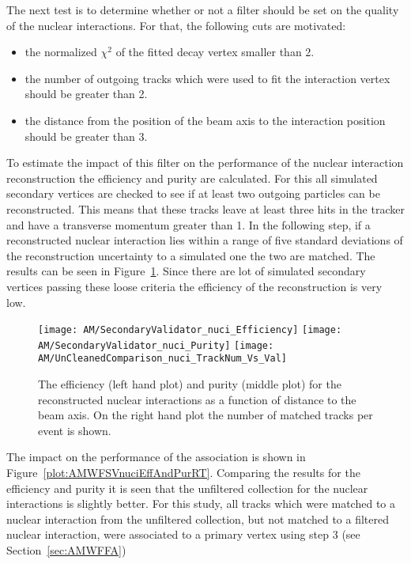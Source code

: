 The next test is to determine whether or not a filter should be set on the quality of the nuclear interactions. For that, the following cuts are motivated:
\begin{itemize}
\item the normalized $\chi^{2}$ of the fitted decay vertex smaller than 2.
\item the number of outgoing tracks which were used to fit the interaction vertex should be greater than 2.
\item the distance from the position of the beam axis to the interaction position should be greater than 3\cm.
\end{itemize}
To estimate the impact of this filter on the performance of the nuclear interaction reconstruction the efficiency and purity are calculated. For this all simulated secondary vertices are checked to see if at least two outgoing particles can be reconstructed. This means that these tracks leave at least three hits in the tracker and have a transverse momentum greater than 1\GeV. In the following step, if a reconstructed nuclear interaction lies within a range of five standard deviations of the reconstruction uncertainty to a simulated one the two are matched. The results can be seen in Figure~\ref{plot:AMWFSVnuciEffAndPurDC}. Since there are lot of simulated secondary vertices passing these loose criteria the efficiency of the reconstruction is very low.

\begin{figure}[!ht]
  \centering
  \texttt{[image: AM/SecondaryValidator\_nuci\_Efficiency]}
  \texttt{[image: AM/SecondaryValidator\_nuci\_Purity]}
  \texttt{[image: AM/UnCleanedComparison\_nuci\_TrackNum\_Vs\_Val]}
  \caption[Purity and efficiency of the reconstructed nuclear interactions as a function of distance to the beam axis and number of matched tracks]{The efficiency (left hand plot) and purity (middle plot) for the reconstructed nuclear interactions as a function of distance to the beam axis. On the right hand plot the number of matched tracks per event is shown. \label{plot:AMWFSVnuciEffAndPurDC}}
\end{figure}

The impact on the performance of the association is shown in Figure~\ref{plot:AMWFSVnuciEffAndPurRT}. Comparing the results for the efficiency and purity it is seen that the unfiltered collection for the nuclear interactions is slightly better. For this study, all tracks which were matched to a nuclear interaction from the unfiltered collection, but not matched to a filtered nuclear interaction, were associated to a primary vertex using step 3 (see Section~\ref{sec:AMWFFA})

